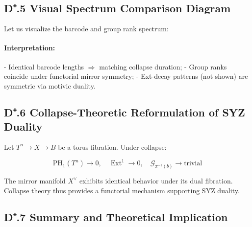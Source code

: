 \documentclass[11pt]{article}
\DeclareMathOperator{\Ext}{Ext}
\begin{document}
\subsection*{D⁺.5 Visual Spectrum Comparison Diagram}

Let us visualize the barcode and group rank spectrum:

\begin{center}
\end{center}

\paragraph{Interpretation:}
- Identical barcode lengths $\Rightarrow$ matching collapse duration;
- Group ranks coincide under functorial mirror symmetry;
- Ext-decay patterns (not shown) are symmetric via motivic duality.

\subsection*{D⁺.6 Collapse-Theoretic Reformulation of SYZ Duality}

Let $T^n \rightarrow X \rightarrow B$ be a torus fibration. Under collapse:

\[
\mathrm{PH}_1(T^n) \rightarrow 0, \quad \Ext^1 \rightarrow 0, \quad \mathcal{G}_{\pi^{-1}(b)} \rightarrow \text{trivial}
\]

The mirror manifold $X^{\vee}$ exhibits identical behavior under its dual fibration. Collapse theory thus provides a functorial mechanism supporting SYZ duality.

\subsection*{D⁺.7 Summary and Theoretical Implication}
\end{document}
